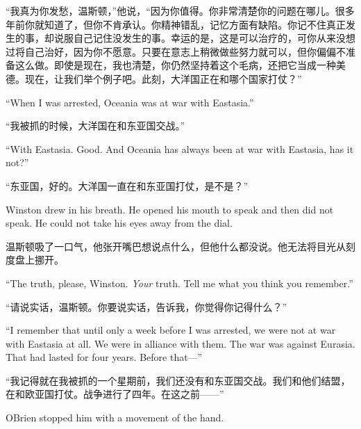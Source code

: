 \begin{paracol}{2}
\switchcolumn

``我真为你发愁，温斯顿，''他说，``因为你值得。你非常清楚你的问题在哪儿。很多年前你就知道了，但你不肯承认。你精神错乱，记忆方面有缺陷。你记不住真正发生的事，却说服自己记住没发生的事。幸运的是，这是可以治疗的，可你从来没想过将自己治好，因为你不愿意。只要在意志上稍微做些努力就可以，但你偏偏不准备这么做。即使是现在，我也清楚，你仍然坚持着这个毛病，还把它当成一种美德。现在，让我们举个例子吧。此刻，大洋国正在和哪个国家打仗？''

\switchcolumn*

``When I was arrested, Oceania was at war with Eastasia.''

\switchcolumn

``我被抓的时候，大洋国在和东亚国交战。''

\switchcolumn*

``With Eastasia. Good. And Oceania has always been at war with Eastasia,
has it not?''

\switchcolumn

``东亚国，好的。大洋国一直在和东亚国打仗，是不是？''

\switchcolumn*

Winston drew in his breath. He opened his mouth to speak and then did
not speak. He could not take his eyes away from the dial.

\switchcolumn

温斯顿吸了一口气，他张开嘴巴想说点什么，但他什么都没说。他无法将目光从刻度盘上挪开。

\switchcolumn*

``The truth, please, Winston. \emph{Your} truth. Tell me what you think
you remember.''

\switchcolumn

``请说实话，温斯顿。你要说实话，告诉我，你觉得你记得什么？''

\switchcolumn*

``I remember that until only a week before I was arrested, we were not at
war with Eastasia at all. We were in alliance with them. The war was
against Eurasia. That had lasted for four years. Before that---''

\switchcolumn

``我记得就在我被抓的一个星期前，我们还没有和东亚国交战。我们和他们结盟，在和欧亚国打仗。战争进行了四年。在这之前——''

\switchcolumn*

O\textquotesingle Brien stopped him with a movement of the hand.

\switchcolumn


\end{paracol}
